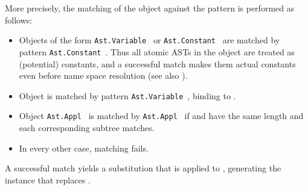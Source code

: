 \begin{isabellebody}
\begin{isamarkuptext}
  More precisely, the matching of the object  against the
  pattern  is performed as follows:

  \begin{itemize}

  \item Objects of the form \verb|Ast.Variable|~ or \verb|Ast.Constant|~ are matched by pattern \verb|Ast.Constant|~.  Thus all atomic ASTs in the object are
  treated as (potential) constants, and a successful match makes them
  actual constants even before name space resolution (see also
  ).

  \item Object  is matched by pattern \verb|Ast.Variable|~, binding  to .

  \item Object \verb|Ast.Appl|~ is matched by \verb|Ast.Appl|~ if  and  have the
  same length and each corresponding subtree matches.

  \item In every other case, matching fails.

  \end{itemize}

  A successful match yields a substitution that is applied to , generating the instance that replaces .


\end{isamarkuptext}
\end{isabellebody}
